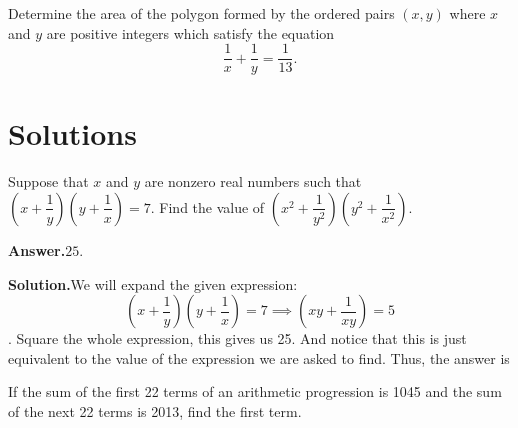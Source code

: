 \documentclass[12pt,paper=letter]{scrartcl}
\newcommand{\ans}[1]{{\sffamily \bfseries Answer.}\;\(\boxed{\text{#1}}\).}
\newcommand{\sol}{{\sffamily \bfseries Solution.}\;}
\begin{document}
\begin{problem} 
\begin{center}
\end{center}
\end{problem}

\begin{problem} 
Determine the area of the polygon formed by the ordered pairs $(x, y)$ where $x$ and $y$ are positive integers which satisfy the equation $$\dfrac{1}{x} + \dfrac{1}{y} = \dfrac{1}{13}.$$
\end{problem}



\section*{Solutions}

\vspace{3mm}

\begin{probboxed} Suppose that $x$ and $y$ are nonzero real numbers such that $\left(x + \dfrac{1}{y}\right)\left(y + \dfrac{1}{x}\right) = 7.$ Find the value of $\left(x^2 + \dfrac{1}{y^2}\right) \left(y^2 + \dfrac{1}{x^2}\right)$.

\end{probboxed}

\ans{25}

\sol We will expand the given expression:  $$\left(x + \dfrac{1}{y}\right)\left(y + \dfrac{1}{x}\right) = 7 \implies \left(xy + \dfrac{1}{xy} \right) = 5$$. Square the whole expression, this gives us 25. And notice that this is just equivalent to the value of the expression we are asked to find. Thus, the answer is 


\begin{probboxed}
If the sum of the first 22 terms of an arithmetic progression is 1045 and the sum of the next 22 terms is 2013, find the first term.

\end{probboxed}
\end{document}
